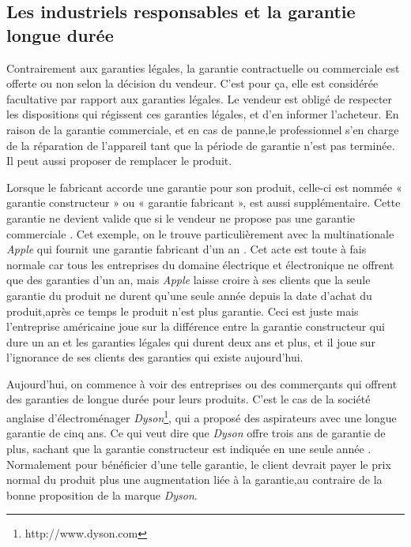 \subsection{Les industriels responsables et la garantie longue durée}


\smallbreak
Contrairement aux garanties légales, la garantie contractuelle ou commerciale est offerte ou non selon la décision du vendeur. C'est pour ça, elle est considérée facultative par rapport aux garanties légales. Le vendeur est obligé de respecter les dispositions qui régissent ces garanties légales, et d'en informer l'acheteur. 
En raison de la garantie commerciale, et en cas de panne,le professionnel s’en charge de la réparation de l’appareil tant que la période de garantie n'est pas terminée. Il peut aussi proposer de remplacer le produit.


\smallbreak
Lorsque le fabricant accorde une garantie pour son produit, celle-ci est nommée « garantie constructeur » ou « garantie fabricant », est aussi supplémentaire. Cette garantie ne devient valide que si le vendeur ne propose pas une garantie commerciale \cite{loigarantie}.
\smallbreak
Cet exemple, on le trouve particulièrement avec la multinationale \textit{Apple} qui fournit une garantie fabricant d’un an \cite{apple}. Cet acte est toute à fais normale car tous les entreprises du domaine électrique et électronique ne offrent que des garanties d’un an, mais \textit{Apple} laisse croire à ses clients que la seule garantie du produit ne durent qu'une seule année depuis la date d'achat du produit,après ce temps le produit n'est plus garantie. Ceci est juste mais l'entreprise américaine joue sur la différence entre la garantie constructeur qui dure un an et les garanties légales qui durent deux ans et plus, et il joue sur l'ignorance de ses clients des garanties qui existe aujourd'hui.


\smallbreak
Aujourd'hui, on commence à voir des entreprises ou des commerçants qui offrent des garanties de longue durée pour leurs produits.
\smallbreak C'est le cas de la société anglaise d’électroménager \textit{Dyson}\footnote{http://www.dyson.com}, qui a proposé des aspirateurs avec une longue garantie de cinq ans. Ce qui veut dire que \textit{Dyson} offre trois ans de garantie de plus, sachant que la garantie constructeur est indiquée en une seule année \cite{dyson}. Normalement pour bénéficier d'une telle garantie, le client devrait payer le prix normal du produit plus une augmentation liée à la garantie,au contraire de la bonne proposition de la marque \textit{Dyson}.


